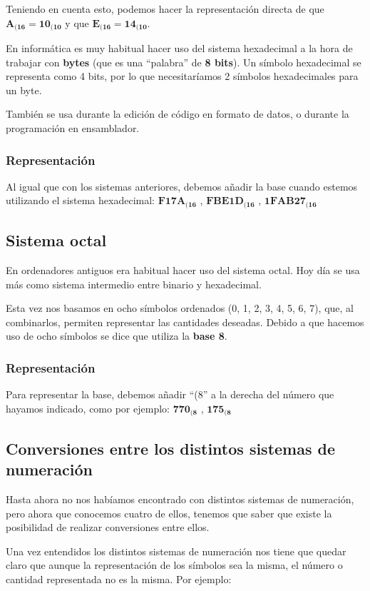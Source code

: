 Teniendo en cuenta esto, podemos hacer la representación directa de que $\mathbf{A_{(16} = 10_{(10}}$ y que $\mathbf{E_{(16} = 14_{(10}}$.

En informática es muy habitual hacer uso del sistema hexadecimal a la hora de trabajar con \textbf{bytes} (que es una “palabra” de \textbf{8 bits}). Un símbolo hexadecimal se representa como 4 bits, por lo que necesitaríamos 2 símbolos hexadecimales para un byte.

También se usa durante la edición de código en formato de datos, o durante la programación en ensamblador.

\subsubsection*{Representación}
Al igual que con los sistemas anteriores, debemos añadir la base cuando estemos utilizando el sistema hexadecimal: $\mathbf{ F17A_{(16}} $ , $\mathbf{ FBE1D_{(16}} $ , $\mathbf{ 1FAB27_{(16}} $


\subsection{Sistema octal}
En ordenadores antiguos era habitual hacer uso del sistema octal. Hoy día se usa más como sistema intermedio entre binario y hexadecimal.

Esta vez nos basamos en ocho símbolos ordenados (0, 1, 2, 3, 4, 5, 6, 7), que, al combinarlos, permiten representar las cantidades deseadas. Debido a que hacemos uso de ocho símbolos se dice que utiliza la \textbf{base 8}.

\subsubsection*{Representación}
Para representar la base, debemos añadir “(8” a la derecha del número que hayamos indicado, como por ejemplo: $\mathbf{ 770_{(8} }$ , $\mathbf{ 175_{(8}} $


\subsection{Conversiones entre los distintos sistemas de numeración}

Hasta ahora no nos habíamos encontrado con distintos sistemas de numeración, pero ahora que conocemos cuatro de ellos, tenemos que saber que existe la posibilidad de realizar conversiones entre ellos.


Una vez entendidos los distintos sistemas de numeración nos tiene que quedar claro que aunque la representación de los símbolos sea la misma, el número o cantidad representada no es la misma. Por ejemplo:

